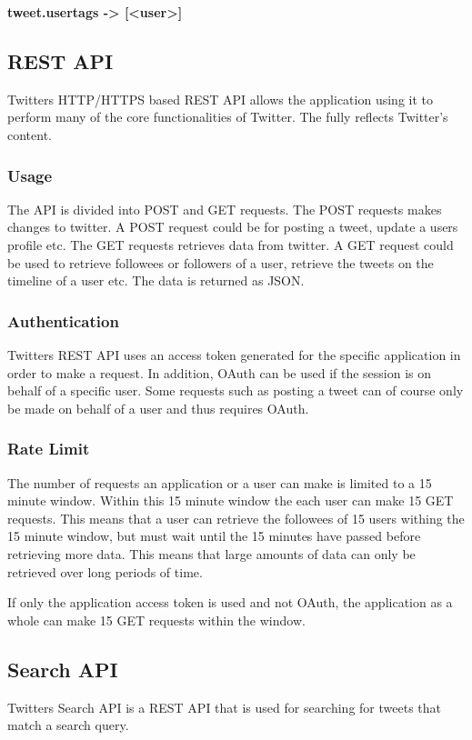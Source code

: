 \textbf{tweet.usertags -> [<user>]}

\subsection{REST API}
Twitters HTTP/HTTPS based REST API allows the application using it to perform many of the core functionalities of Twitter. The fully reflects Twitter's content.

\subsubsection{Usage}
The API is divided into POST and GET requests. The POST requests makes changes to twitter. A POST request could be for posting a tweet, update a users profile etc. The GET requests retrieves data from twitter. A GET request could be used to retrieve followees or followers of a user, retrieve the tweets on the timeline of a user etc. The data is returned as JSON. \cite{twitter-rest-api}

\subsubsection{Authentication}
Twitters REST API uses an access token generated for the specific application in order to make a request. In addition, OAuth can be used if the session is on behalf of a specific user. Some requests such as posting a tweet can of course only be made on behalf of a user and thus requires OAuth. \cite{twitter-rest-api}

\subsubsection{Rate Limit}
The number of requests an application or a user can make is limited to a 15 minute window. Within this 15 minute window the each user can make 15 GET requests. This means that a user can retrieve the followees of 15 users withing the 15 minute window, but must wait until the 15 minutes have passed before retrieving more data. This means that large amounts of data can only be retrieved over long periods of time.

If only the application access token is used and not OAuth, the application as a whole can make 15 GET requests within the window. \cite{twitter-rate-limiting}

\subsection{Search API}
Twitters Search API is a REST API that is used for searching for tweets that match a search query.

